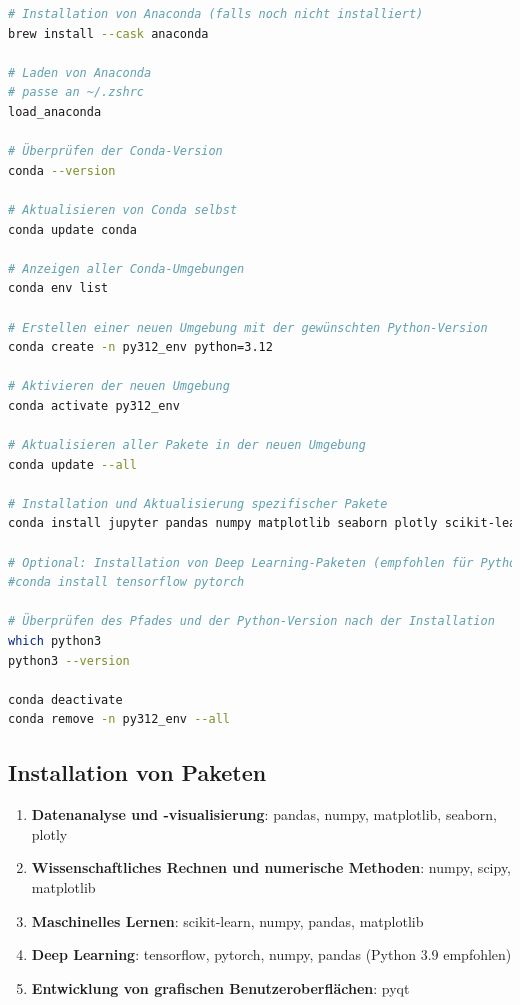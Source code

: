 \documentclass{vorlage-design-main}
\begin{document}
\begin{lstlisting}[language=bash]
# Installation von Anaconda (falls noch nicht installiert)
brew install --cask anaconda

# Laden von Anaconda
# passe an ~/.zshrc
load_anaconda

# Überprüfen der Conda-Version
conda --version

# Aktualisieren von Conda selbst
conda update conda

# Anzeigen aller Conda-Umgebungen
conda env list

# Erstellen einer neuen Umgebung mit der gewünschten Python-Version
conda create -n py312_env python=3.12

# Aktivieren der neuen Umgebung
conda activate py312_env

# Aktualisieren aller Pakete in der neuen Umgebung
conda update --all

# Installation und Aktualisierung spezifischer Pakete
conda install jupyter pandas numpy matplotlib seaborn plotly scikit-learn scipy pyqt

# Optional: Installation von Deep Learning-Paketen (empfohlen für Python 3.9)
#conda install tensorflow pytorch

# Überprüfen des Pfades und der Python-Version nach der Installation
which python3
python3 --version

conda deactivate
conda remove -n py312_env --all
\end{lstlisting}

\subsection{Installation von Paketen}\label{installation-von-paketen}

\begin{enumerate}
\def\labelenumi{\arabic{enumi}.}

\item
  \textbf{Datenanalyse und -visualisierung}: pandas, numpy, matplotlib,
  seaborn, plotly
\item
  \textbf{Wissenschaftliches Rechnen und numerische Methoden}: numpy,
  scipy, matplotlib
\item
  \textbf{Maschinelles Lernen}: scikit-learn, numpy, pandas, matplotlib
\item
  \textbf{Deep Learning}: tensorflow, pytorch, numpy, pandas (Python 3.9
  empfohlen)
\item
  \textbf{Entwicklung von grafischen Benutzeroberflächen}: pyqt
\end{enumerate}
\end{document}
